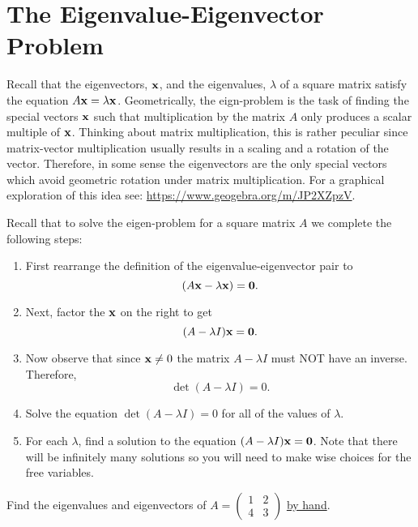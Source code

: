 \newpage

\newpage\section{The Eigenvalue-Eigenvector Problem}
Recall that the eigenvectors, ${\bf x}$, and the eigenvalues, $\lambda$ of a square matrix satisfy the
equation $A{\bf x}=\lambda {\bf x}$. Geometrically, the eign-problem is the task of finding the special
vectors ${\bf x}$ such that multiplication by the matrix $A$ only produces a scalar multiple of
${\bf x}$. Thinking about matrix multiplication, this is rather peculiar since matrix-vector
multiplication usually results in a scaling and a rotation of the vector. Therefore, in
some sense the eigenvectors are the only special vectors which avoid geometric rotation
under matrix multiplication.  For a graphical exploration of this idea see:
\href{https://www.geogebra.org/m/JP2XZpzV}{https://www.geogebra.org/m/JP2XZpzV}.

Recall that to solve the eigen-problem for a square matrix $A$ we complete the following
steps:
\begin{enumerate}
    \item First rearrange the definition of the eigenvalue-eigenvector pair to 
        \[ (A{\bf x}-\lambda {\bf x})={\bf 0}. \]
    \item Next, factor the ${\bf x}$ on the right to get 
        \[ (A-\lambda I) {\bf x}={\bf 0}. \]
    \item Now observe that since ${\bf x} \ne 0$ the matrix $A-\lambda I$ must NOT have an inverse. Therefore,
        \[ \det(A-\lambda I)=0. \]
    \item Solve the equation $\det(A-\lambda I)=0$ for all of the values of $\lambda$.
    \item For each $\lambda$, find a solution to the equation $(A-\lambda I) {\bf x}={\bf 0}$.
        Note that there will be infinitely many solutions so you will need to make wise
        choices for the free variables.
\end{enumerate}
\begin{problem}
    Find the eigenvalues and eigenvectors of $A = \begin{pmatrix} 1 & 2 \\ 4 & 3
    \end{pmatrix}$ \underline{by hand}.
\end{problem}

